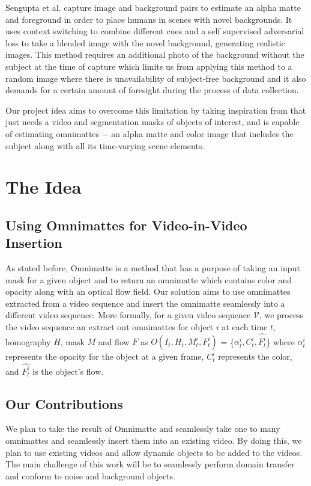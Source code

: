 \documentclass{article}
\begin{document}
Sengupta et al.\cite{BMSengupta20} capture image and background pairs to estimate an alpha matte and foreground in order to place humans in scenes with novel backgrounds. It uses context switching to combine different cues and a self supervised adversarial loss to take a blended image with the novel background, generating realistic images. This method requires an additional photo of the background without the subject at the time of capture which limits us from applying this method to a random image where there is unavailability of subject-free background and it also demands for a certain amount of foresight during the process of data collection. 

Our project idea aims to overcome this limitation\cite{BMSengupta20} by taking inspiration from\cite{lu2021} that just needs a video and segmentation masks of objects of interest, and is capable of estimating omnimattes $-$ an alpha matte and color image that includes the subject along with all its time-varying scene elements. 


\section{The Idea}

\subsection{Using Omnimattes for Video-in-Video Insertion}
As stated before, Omnimatte is a method that has a purpose of taking an input mask for a given object and to return an omnimatte which contains color and opacity along with an optical flow field. Our solution aims to use omnimattes extracted from a video sequence and insert the omnimatte seamlessly into a different video sequence. More formally, for a given video sequence $\mathcal{V}$, we process the video sequence an extract out omnimattes for object $i$ at each time $t$, homography $H$, mask $M$ and flow $F$ as $O(I_t, H_t, M_t^i, F_t^i)$ = \{$\alpha_t^i, C_t^i, \hat{F_t^i}$\} where $\alpha_t^i$ represents the opacity for the object at a given frame, $C_t^i$ represents the color, and $\hat{F_t^i}$ is the object's flow.

\subsection{Our Contributions}
We plan to take the result of Omnimatte and seamlessly take one to many omnimattes and seamlessly insert them into an existing video. By doing this, we plan to use existing videos and allow dynamic objects to be added to the videos. The main challenge of this work will be to seamlessly perform domain transfer and conform to noise and background objects.
\end{document}
